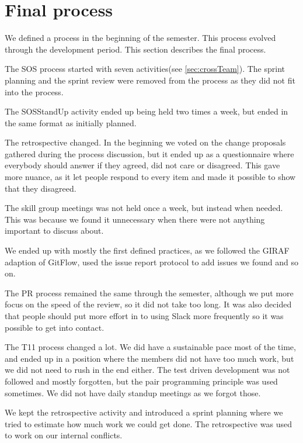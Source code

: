 \section{Final process}
We defined a process in the beginning of the semester. This process evolved through the development period. This section describes the final process. 

The \gls{SOS} process started with seven activities(see \ref{sec:crossTeam}). The sprint planning and the sprint review were removed from the process as they did not fit into the process. 

The \gls{SOSStandUp} activity ended up being held two times a week, but ended in the same format as initially planned. 

The retrospective changed. In the beginning we voted on the change proposals gathered during the process discussion, but it ended up as a questionnaire where everybody should answer if they agreed, did not care or disagreed. This gave more nuance, as it let people respond to every item and made it possible to show that they disagreed.

The skill group meetings was not held once a week, but instead when needed. This was because we found it unnecessary when there were not anything important to discuss about. 

We ended up with mostly the first defined practices, as we followed the GIRAF adaption of GitFlow, used the issue report protocol to add issues we found and so on. 

The PR process remained the same through the semester, although we put more focus on the speed of the review, so it did not take too long. It was also decided that people should put more effort in to using Slack more frequently so it was possible to get into contact. 

The \gls{T11} process changed a lot. We did have a sustainable pace most of the time, and ended up in a position where the members did not have too much work, but we did not need to rush in the end either. The test driven development was not followed and mostly forgotten, but the pair programming principle was used sometimes. We did not have daily standup meetings as we forgot those. 

We kept the retrospective activity and introduced a sprint planning where we tried to estimate how much work we could get done. The retrospective was used to work on our internal conflicts. 
